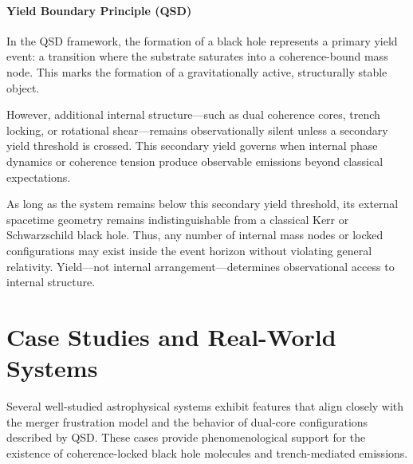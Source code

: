 \documentclass[sn-mathphys]{sn-jnl}
\theoremstyle{thmstyleone}%
\theoremstyle{thmstyletwo}%
\theoremstyle{thmstylethree}%
\begin{document}
\paragraph{Yield Boundary Principle (QSD)}
In the QSD framework, the formation of a black hole represents a primary yield event: a transition where the substrate saturates into a coherence-bound mass node. This marks the formation of a gravitationally active, structurally stable object.

However, additional internal structure—such as dual coherence cores, trench locking, or rotational shear—remains observationally silent unless a secondary yield threshold is crossed. This secondary yield governs when internal phase dynamics or coherence tension produce observable emissions beyond classical expectations.

As long as the system remains below this secondary yield threshold, its external spacetime geometry remains indistinguishable from a classical Kerr or Schwarzschild black hole. Thus, any number of internal mass nodes or locked configurations may exist inside the event horizon without violating general relativity. Yield—not internal arrangement—determines observational access to internal structure.



\section{Case Studies and Real-World Systems}

Several well-studied astrophysical systems exhibit features that align closely with the merger frustration model and the behavior of dual-core configurations described by QSD. These cases provide phenomenological support for the existence of coherence-locked black hole molecules and trench-mediated emissions.
\end{document}
